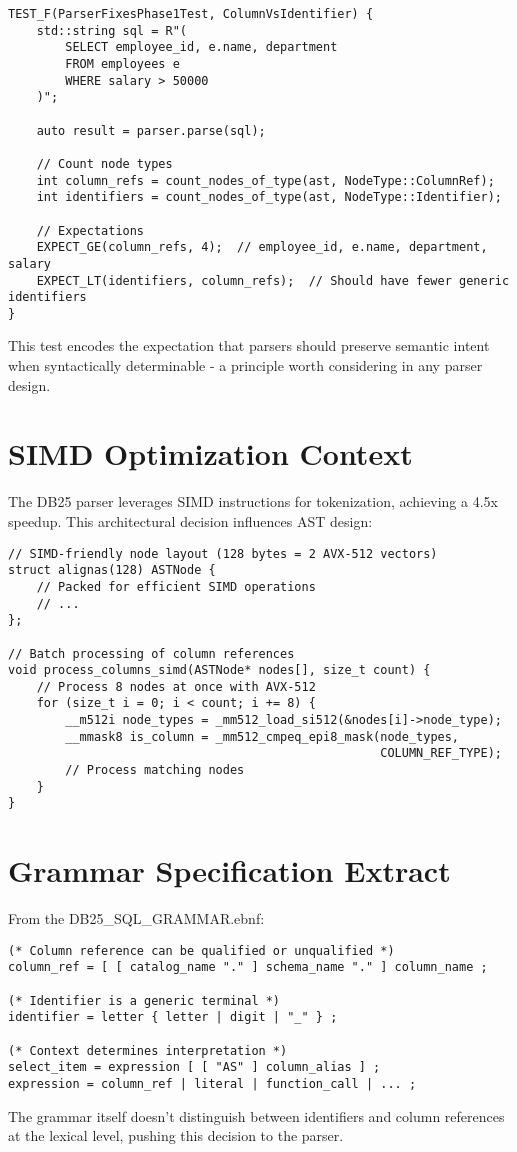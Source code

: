 \documentclass[11pt,a4paper]{article}
\begin{document}
\begin{lstlisting}[style=cpp]
TEST_F(ParserFixesPhase1Test, ColumnVsIdentifier) {
    std::string sql = R"(
        SELECT employee_id, e.name, department
        FROM employees e
        WHERE salary > 50000
    )";
    
    auto result = parser.parse(sql);
    
    // Count node types
    int column_refs = count_nodes_of_type(ast, NodeType::ColumnRef);
    int identifiers = count_nodes_of_type(ast, NodeType::Identifier);
    
    // Expectations
    EXPECT_GE(column_refs, 4);  // employee_id, e.name, department, salary
    EXPECT_LT(identifiers, column_refs);  // Should have fewer generic identifiers
}
\end{lstlisting}

This test encodes the expectation that parsers should preserve semantic intent when syntactically determinable - a principle worth considering in any parser design.

\section{SIMD Optimization Context}

The DB25 parser leverages SIMD instructions for tokenization, achieving a 4.5x speedup. This architectural decision influences AST design:

\begin{lstlisting}[style=cpp]
// SIMD-friendly node layout (128 bytes = 2 AVX-512 vectors)
struct alignas(128) ASTNode {
    // Packed for efficient SIMD operations
    // ...
};

// Batch processing of column references
void process_columns_simd(ASTNode* nodes[], size_t count) {
    // Process 8 nodes at once with AVX-512
    for (size_t i = 0; i < count; i += 8) {
        __m512i node_types = _mm512_load_si512(&nodes[i]->node_type);
        __mmask8 is_column = _mm512_cmpeq_epi8_mask(node_types, 
                                                    COLUMN_REF_TYPE);
        // Process matching nodes
    }
}
\end{lstlisting}

\section{Grammar Specification Extract}

From the DB25\_SQL\_GRAMMAR.ebnf:

\begin{lstlisting}[style=sql]
(* Column reference can be qualified or unqualified *)
column_ref = [ [ catalog_name "." ] schema_name "." ] column_name ;

(* Identifier is a generic terminal *)
identifier = letter { letter | digit | "_" } ;

(* Context determines interpretation *)
select_item = expression [ [ "AS" ] column_alias ] ;
expression = column_ref | literal | function_call | ... ;
\end{lstlisting}

The grammar itself doesn't distinguish between identifiers and column references at the lexical level, pushing this decision to the parser.
\end{document}
